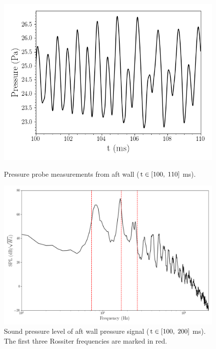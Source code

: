 \begin{figure}
	\begin{minipage}{0.48\linewidth}
		\includegraphics[width=0.99\linewidth,trim={0.5em 0.5em 0.5em 0.5em},clip]{Chapters/CavityAndCVRC/Images/cavity/pressure_probe_fom_10ms.png}
		\caption{\label{fig:cavityFOMProbe}Pressure probe measurements from aft wall ($\text{t} \in [100, \; 110]$ ms).}
	\end{minipage} \hspace{0.5em}
	\begin{minipage}{0.48\linewidth}
		\includegraphics[width=0.99\linewidth,trim={0.5em 0.5em 0.5em 0.5em},clip]{Chapters/CavityAndCVRC/Images/cavity/psd_fom_100ms.png}
		\caption{\label{fig:rossiterModeProof}Sound pressure level of aft wall pressure signal ($\text{t} \in [100, \; 200]$ ms). The first three Rossiter frequencies are marked in red.}
	\end{minipage}
\end{figure}

